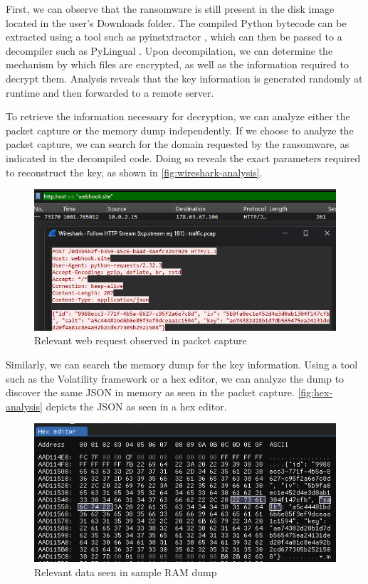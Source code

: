 \documentclass[final,5p,times,twocolumn]{elsarticle}
\begin{document}
First, we can observe that the ransomware is still present in the disk
image located in the user's Downloads folder. The compiled Python
bytecode can be extracted using a tool such as pyinstxtractor
\cite{extremecoders-reExtremecodersrePyinstxtractor2025}, which can
then be passed to a decompiler such as PyLingual
\cite{wiedemeierPYLINGUALPerfectDecompilation2024}. Upon
decompilation, we can determine the mechanism by which files are
encrypted, as well as the information required to decrypt them. Analysis
reveals that the key information is generated randomly at runtime and
then forwarded to a remote server.

To retrieve the information necessary for decryption, we can analyze
either the packet capture or the memory dump independently. If we choose
to analyze the packet capture, we can search for the domain requested by
the ransomware, as indicated in the decompiled code. Doing so reveals
the exact parameters required to reconstruct the key, as shown in
\autoref{fig:wireshark-analysis}.

\begin{figure}[htbp]
\centering
\includegraphics[width=1\linewidth]{wireshark-analysis.png}
\caption{Relevant web request observed in packet
capture}\label{fig:wireshark-analysis}
\end{figure}

Similarly, we can search the memory dump for the key information. Using
a tool such as the Volatility framework or a hex editor, we can analyze
the dump to discover the same JSON in memory as seen in the packet
capture. \autoref{fig:hex-analysis} depicts the JSON as seen in a hex
editor.

\begin{figure}[htbp]
\centering
\includegraphics[width=1\linewidth]{hex-analysis.png}
\caption{Relevant data seen in sample RAM dump}\label{fig:hex-analysis}
\end{figure}
\end{document}
